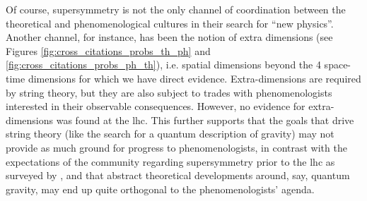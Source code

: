 \documentclass[smallextended]{svjour3}
\begin{document}
Of course, supersymmetry is not the only channel of coordination between the theoretical and phenomenological cultures in their search for ``new physics''. Another channel, for instance, has been the notion of extra dimensions (see Figures \ref{fig:cross_citations_probs_th_ph} and \ref{fig:cross_citations_probs_ph_th}), i.e. spatial dimensions beyond the 4 space-time dimensions for which we have direct evidence. Extra-dimensions are required by string theory, but they are also subject to trades with phenomenologists interested in their observable consequences. However, no evidence for extra-dimensions was found at the \gls{lhc}. This further supports that the goals that drive string theory (like the search for a quantum description of gravity) may not provide as much ground for progress to phenomenologists, in contrast with the expectations of the community regarding supersymmetry prior to the \gls{lhc}  as surveyed by \citealt{Mttig2019,Mttig2020a}, and that abstract theoretical developments around, say, quantum gravity, may end up quite orthogonal to the phenomenologists' agenda.
\end{document}
